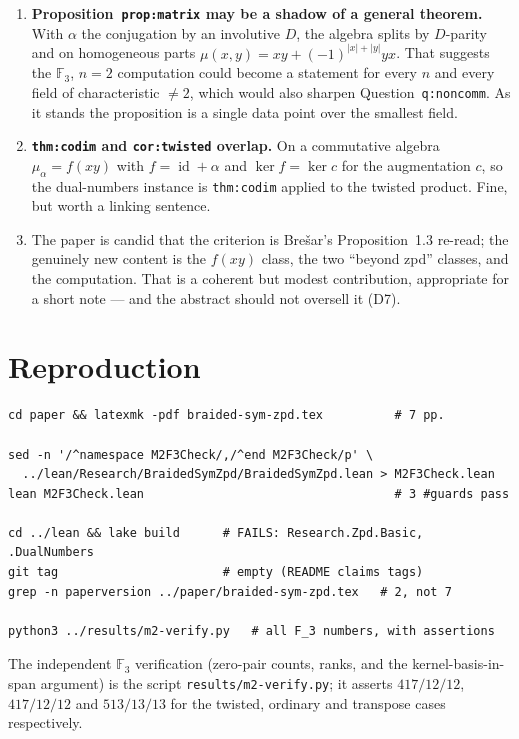 \documentclass[11pt,a4paper]{article}
\newcommand{\cpt}[1]{\texttt{#1}}          %
\begin{document}
\begin{enumerate}[label=\arabic*.,leftmargin=1.8em,itemsep=3pt]
\item \textbf{Proposition~\cpt{prop:matrix} may be a shadow of a general theorem.} With
$\alpha$ the conjugation by an involutive $D$, the algebra splits by $D$-parity and on homogeneous parts
$\mu(x,y)=xy+(-1)^{|x|+|y|}yx$. That suggests the $\mathbb{F}_3$, $n=2$ computation could become a
statement for every $n$ and every field of characteristic $\ne2$, which would also sharpen
Question~\cpt{q:noncomm}. As it stands the proposition is a single data point over the smallest field.

\item \textbf{\cpt{thm:codim} and \cpt{cor:twisted} overlap.} On a commutative algebra
$\mu_\alpha=f(xy)$ with $f=\operatorname{id}+\alpha$ and $\ker f=\ker c$ for the augmentation $c$, so the
dual-numbers instance is \cpt{thm:codim} applied to the twisted product. Fine, but worth a linking
sentence.

\item The paper is candid that the criterion is Bre\v{s}ar's Proposition~1.3 re-read; the genuinely new
content is the $f(xy)$ class, the two ``beyond zpd'' classes, and the computation. That is a coherent but
modest contribution, appropriate for a short note --- and the abstract should not oversell it (D7).
\end{enumerate}

\section{Reproduction}

\begin{verbatim}
cd paper && latexmk -pdf braided-sym-zpd.tex          # 7 pp.

sed -n '/^namespace M2F3Check/,/^end M2F3Check/p' \
  ../lean/Research/BraidedSymZpd/BraidedSymZpd.lean > M2F3Check.lean
lean M2F3Check.lean                                   # 3 #guards pass

cd ../lean && lake build      # FAILS: Research.Zpd.Basic, .DualNumbers
git tag                       # empty (README claims tags)
grep -n paperversion ../paper/braided-sym-zpd.tex   # 2, not 7

python3 ../results/m2-verify.py   # all F_3 numbers, with assertions
\end{verbatim}

\noindent
The independent $\mathbb{F}_3$ verification (zero-pair counts, ranks, and the kernel-basis-in-span
argument) is the script \cpt{results/m2-verify.py}; it asserts $417/12/12$, $417/12/12$ and $513/13/13$
for the twisted, ordinary and transpose cases respectively.
\end{document}
